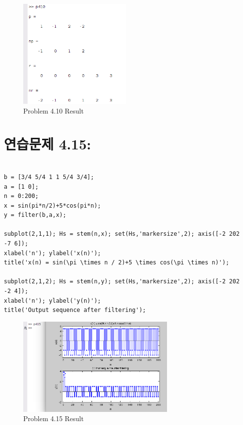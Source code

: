 \documentclass[11pt
  , a4paper
  , article
  , oneside
]{memoir}
\begin{document}
\begin{figure}[h!]
	\centering
	\includegraphics[width=0.5\textwidth,height=0.25\textwidth]{./images/p410.png}
	\caption{Problem 4.10 Result}
	\label{fig:Problem 4.10 Result}
\end{figure}

\chapter{연습문제 4.15: }
\begin{lstlisting}[style=termstyle]
%Problem 4.15

b = [3/4 5/4 1 1 5/4 3/4]; 
a = [1 0];
n = 0:200; 
x = sin(pi*n/2)+5*cos(pi*n); 
y = filter(b,a,x);

subplot(2,1,1); Hs = stem(n,x); set(Hs,'markersize',2); axis([-2 202 -7 6]);
xlabel('n'); ylabel('x(n)');
title('x(n) = sin(\pi \times n / 2)+5 \times cos(\pi \times n)');

subplot(2,1,2); Hs = stem(n,y); set(Hs,'markersize',2); axis([-2 202 -2 4]);
xlabel('n'); ylabel('y(n)');
title('Output sequence after filtering');
\end{lstlisting}

\begin{figure}[h!]
	\centering
	\includegraphics[width=0.7\textwidth,height=0.4\textwidth]{./images/p415.png}
	\caption{Problem 4.15 Result}
	\label{fig:Problem 4.15 Result}
\end{figure}
\end{document}
